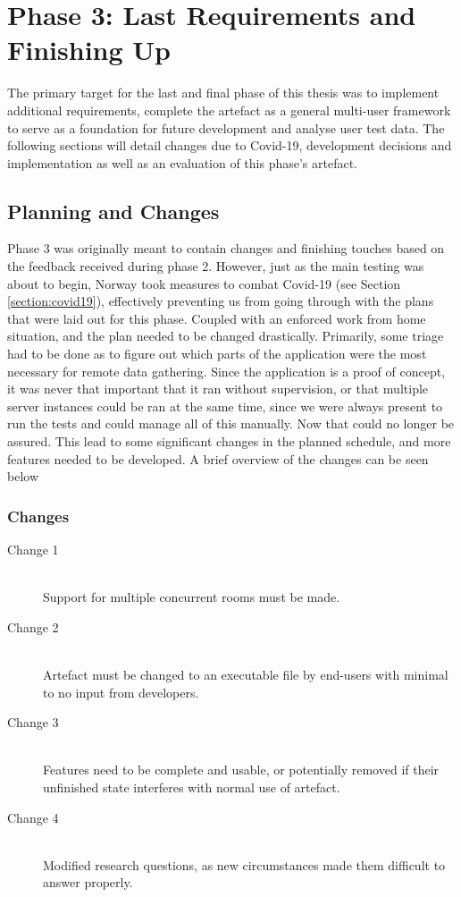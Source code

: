 
\chapter{Phase 3: Last Requirements and Finishing Up} 
\label{chap:7}
\label{chap:phase3}
The primary target for the last and final phase of this thesis was to implement additional requirements, complete the artefact as a general multi-user framework to serve as a foundation for future development and analyse user test data. The following sections will detail changes due to Covid-19, development decisions and implementation as well as an evaluation of this phase's artefact.                 


\section{Planning and Changes}
Phase 3 was originally meant to contain changes and finishing touches based on the feedback received during phase 2. However, just as the main testing was about to begin, Norway took measures to combat Covid-19 (see Section \ref{section:covid19}), effectively preventing us from going through with the plans that were laid out for this phase. Coupled with an enforced work from home situation, and the plan needed to be changed drastically. Primarily, some triage had to be done as to figure out which parts of the application were the most necessary for remote data gathering. Since the application is a proof of concept, it was never that important that it ran without supervision, or that multiple server instances could be ran at the same time, since we were always present to run the tests and could manage all of this manually. Now that could no longer be assured. This lead to some significant changes in the planned schedule, and more features needed to be developed. A brief overview of the changes can be seen below

\subsection{Changes}
\begin{description}
    \item [Change 1]\hfill \\
    Support for multiple concurrent rooms must be made. 
    \item [Change 2]\hfill \\
    Artefact must be changed to an executable file by end-users with minimal to no input from developers.
    \item [Change 3]\hfill \\
    Features need to be complete and usable, or potentially removed if their unfinished state interferes with normal use of artefact.
    \item[Change 4]\hfill \\
    Modified research questions, as new circumstances made them difficult to answer properly.
\end{description}

